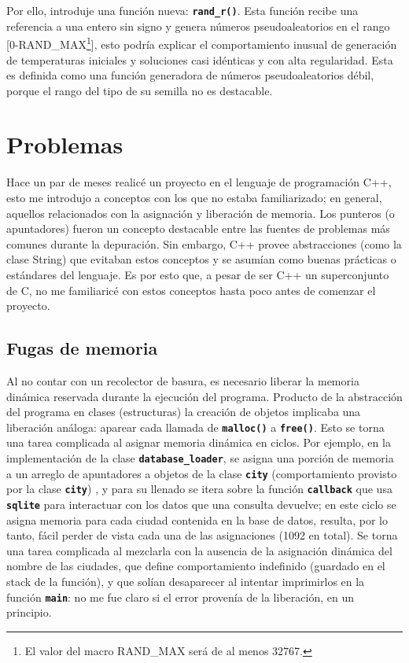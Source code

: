 \documentclass[a4paper]{report}
\begin{document}
Por ello, introduje una funci\'on nueva: \textbf{\texttt{rand\_r()}}. Esta funci\'on recibe una referencia
a una entero sin signo y genera n\'umeros pseudoaleatorios en el rango [0-RAND\_MAX\footnote{El valor del
  macro RAND\_MAX ser\'a de al menos 32767.}], esto podr\'ia explicar el comportamiento inusual de generaci\'on
de temperaturas iniciales y soluciones casi id\'enticas y con alta regularidad. Esta es definida como una funci\'on
generadora de n\'umeros pseudoaleatorios d\'ebil, porque el rango del tipo de su semilla no es destacable.

\section{Problemas}
Hace un par de meses realic\'e un proyecto en el lenguaje de programaci\'on C++, esto me introdujo a
conceptos con los que no estaba familiarizado; en general, aquellos relacionados con la asignaci\'on
y liberaci\'on de memoria. Los punteros (o apuntadores) fueron un concepto destacable entre las fuentes de
problemas m\'as comunes durante la depuraci\'on. Sin embargo, C++ provee abstracciones (como la clase
String) que evitaban estos conceptos y se asum\'ian como buenas pr\'acticas o est\'andares del lenguaje.
Es por esto que, a pesar de ser C++ un superconjunto de C, no me familiaric\'e con estos conceptos hasta
poco antes de comenzar el proyecto.

\subsection{Fugas de memoria}
Al no contar con un recolector de basura, es necesario liberar la memoria din\'amica reservada durante
la ejecuci\'on del programa. Producto de la abstracci\'on del programa en clases (estructuras)
la creaci\'on de objetos implicaba una liberaci\'on an\'aloga: aparear cada llamada de \textbf{\texttt{malloc()}}
a \textbf{\texttt{free()}}. Esto se torna una tarea complicada al asignar memoria din\'amica en ciclos. Por ejemplo,
en la implementaci\'on de la clase \textbf{\texttt{database\_loader}}, se asigna una porci\'on de memoria a un
arreglo de apuntadores a objetos  de la clase \textbf{\texttt{city}} (comportamiento provisto por la clase
\textbf{\texttt{city}}) , y para su llenado se itera sobre la funci\'on \textbf{\texttt{callback}} que usa
\textbf{\texttt{sqlite}} para interactuar con los datos que una consulta devuelve; en este ciclo se asigna
memoria para cada ciudad contenida en la base de datos, resulta, por lo tanto, f\'acil perder de vista
cada una de las asignaciones (1092 en total). Se torna una tarea complicada al mezclarla con la ausencia
de la asignaci\'on din\'amica del nombre de las ciudades, que define comportamiento indefinido (guardado en
el stack de la funci\'on), y que sol\'ian desaparecer al intentar imprimirlos en la funci\'on \textbf{\texttt{main}}:
no me fue claro si el error proven\'ia de la liberaci\'on, en un principio.\\
\end{document}
